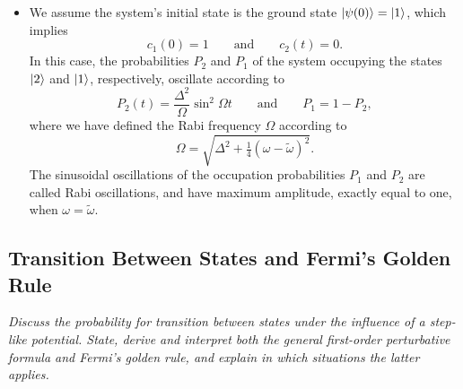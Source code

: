 \documentclass[11pt, a4paper]{article}
\begin{document}
\begin{itemize}
    \item We assume the system's initial state is the ground state $ \ket{\psi(0)} = \ket{1} $, which implies
    \begin{equation*}
        c_{1}(0) = 1 \qquad \text{and} \qquad c_{2}(t) = 0.
    \end{equation*}
    In this case, the probabilities $ P_{2} $ and $ P_{1} $ of the system occupying the states $ \ket{2} $ and $ \ket{1} $, respectively, oscillate according to
    \begin{equation*}
        P_{2}(t) = \frac{\Delta^{2}}{\Omega}\sin^{2}\Omega t \qquad \text{and} \qquad P_{1} = 1 - P_{2},
    \end{equation*}
    where we have defined the Rabi frequency $ \Omega $ according to
    \begin{equation*}
        \Omega = \sqrt{\Delta^{2} + \tfrac{1}{4}(\omega - \tilde{\omega})^{2}}.
    \end{equation*}
    The sinusoidal oscillations of the occupation probabilities $ P_{1} $ and $ P_{2} $ are called Rabi oscillations, and have maximum amplitude, exactly equal to one, when $ \omega = \tilde{\omega} $.
    
\end{itemize}

\subsection{Transition Between States and Fermi's Golden Rule}
\textit{Discuss the probability for transition between states under the influence of a step-like potential. State, derive and interpret both the general first-order perturbative formula and Fermi's golden rule, and explain in which situations the latter applies.}
\end{document}
